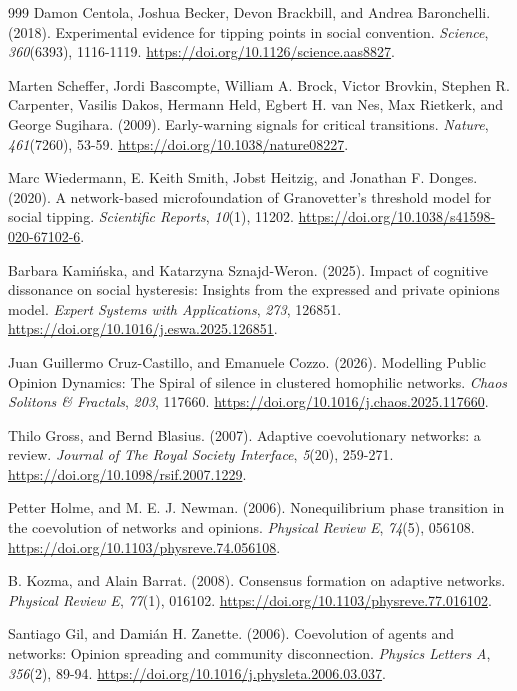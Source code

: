 \begin{thebibliography}{999}
Damon Centola, Joshua Becker, Devon Brackbill, and Andrea Baronchelli. (2018). Experimental evidence for tipping points in social convention. \textit{Science}, \textit{360}(6393), 1116-1119. \url{https://doi.org/10.1126/science.aas8827}.

Marten Scheffer, Jordi Bascompte, William A. Brock, Victor Brovkin, Stephen R. Carpenter, Vasilis Dakos, Hermann Held, Egbert H. van Nes, Max Rietkerk, and George Sugihara. (2009). Early-warning signals for critical transitions. \textit{Nature}, \textit{461}(7260), 53-59. \url{https://doi.org/10.1038/nature08227}.

Marc Wiedermann, E. Keith Smith, Jobst Heitzig, and Jonathan F. Donges. (2020). A network-based microfoundation of Granovetter's threshold model for social tipping. \textit{Scientific Reports}, \textit{10}(1), 11202. \url{https://doi.org/10.1038/s41598-020-67102-6}.

Barbara Kami\'{n}ska, and Katarzyna Sznajd-Weron. (2025). Impact of cognitive dissonance on social hysteresis: Insights from the expressed and private opinions model. \textit{Expert Systems with Applications}, \textit{273}, 126851. \url{https://doi.org/10.1016/j.eswa.2025.126851}.

Juan Guillermo Cruz-Castillo, and Emanuele Cozzo. (2026). Modelling Public Opinion Dynamics: The Spiral of silence in clustered homophilic networks. \textit{Chaos Solitons \& Fractals}, \textit{203}, 117660. \url{https://doi.org/10.1016/j.chaos.2025.117660}.

Thilo Gross, and Bernd Blasius. (2007). Adaptive coevolutionary networks: a review. \textit{Journal of The Royal Society Interface}, \textit{5}(20), 259-271. \url{https://doi.org/10.1098/rsif.2007.1229}.

Petter Holme, and M. E. J. Newman. (2006). Nonequilibrium phase transition in the coevolution of networks and opinions. \textit{Physical Review E}, \textit{74}(5), 056108. \url{https://doi.org/10.1103/physreve.74.056108}.

B. Kozma, and Alain Barrat. (2008). Consensus formation on adaptive networks. \textit{Physical Review E}, \textit{77}(1), 016102. \url{https://doi.org/10.1103/physreve.77.016102}.

Santiago Gil, and Dami\'{a}n H. Zanette. (2006). Coevolution of agents and networks: Opinion spreading and community disconnection. \textit{Physics Letters A}, \textit{356}(2), 89-94. \url{https://doi.org/10.1016/j.physleta.2006.03.037}.


\end{thebibliography}
